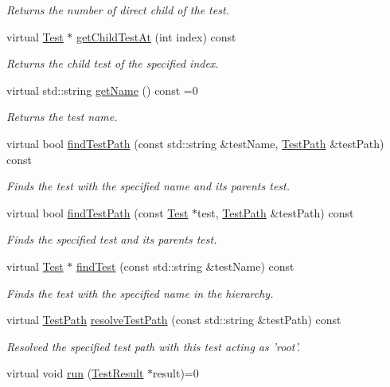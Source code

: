 \begin{DoxyCompactItemize}
\begin{DoxyCompactList}\small\item\em Returns the number of direct child of the test. \end{DoxyCompactList}\item 
virtual \hyperlink{class_test}{Test} $\ast$ \hyperlink{class_test_a5311b8b24ec3d92f749272f5c642d42f}{get\+Child\+Test\+At} (int index) const 
\begin{DoxyCompactList}\small\item\em Returns the child test of the specified index. \end{DoxyCompactList}\item 
virtual std\+::string \hyperlink{class_test_a5e024da199f811a33264e432c21dcc94}{get\+Name} () const =0
\begin{DoxyCompactList}\small\item\em Returns the test name. \end{DoxyCompactList}\item 
virtual bool \hyperlink{class_test_ac14ebe5c88d6edf0280f1205626a89bd}{find\+Test\+Path} (const std\+::string \&test\+Name, \hyperlink{class_test_path}{Test\+Path} \&test\+Path) const 
\begin{DoxyCompactList}\small\item\em Finds the test with the specified name and its parents test. \end{DoxyCompactList}\item 
virtual bool \hyperlink{class_test_aff5ac29caeb2acf85002cbf16276cda8}{find\+Test\+Path} (const \hyperlink{class_test}{Test} $\ast$test, \hyperlink{class_test_path}{Test\+Path} \&test\+Path) const 
\begin{DoxyCompactList}\small\item\em Finds the specified test and its parents test. \end{DoxyCompactList}\item 
virtual \hyperlink{class_test}{Test} $\ast$ \hyperlink{class_test_aba7193712668533f2fa048a93e0f4705}{find\+Test} (const std\+::string \&test\+Name) const 
\begin{DoxyCompactList}\small\item\em Finds the test with the specified name in the hierarchy. \end{DoxyCompactList}\item 
virtual \hyperlink{class_test_path}{Test\+Path} \hyperlink{class_test_a90a4bd044778e025641857fa7ddf12ad}{resolve\+Test\+Path} (const std\+::string \&test\+Path) const 
\begin{DoxyCompactList}\small\item\em Resolved the specified test path with this test acting as 'root'. \end{DoxyCompactList}\item 
\hypertarget{class_test_a7beeb95dc0d058bd3bfea1a75463cb03}{virtual void \hyperlink{class_test_a7beeb95dc0d058bd3bfea1a75463cb03}{run} (\hyperlink{class_test_result}{Test\+Result} $\ast$result)=0}\label{class_test_a7beeb95dc0d058bd3bfea1a75463cb03}


\end{DoxyCompactItemize}
